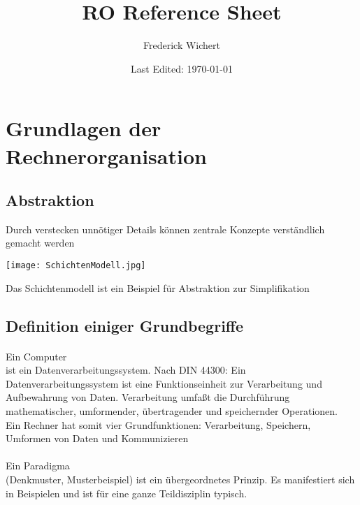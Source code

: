 


\begin{titlepage}
  \title{RO Reference Sheet} %
  \author{Frederick Wichert}
  \date{Last Edited: \today}
\end{titlepage}



	\maketitle
	
	\setcounter{secnumdepth}{2}
	\setcounter{tocdepth}{2}
	\tableofcontents
	
	\newpage
		
\section{Grundlagen der Rechnerorganisation}
	\subsection{Abstraktion}
		Durch verstecken unnötiger Details können zentrale Konzepte verständlich gemacht werden \\
		\begin{center}
			\texttt{[image: SchichtenModell.jpg]}
		\end{center}
		Das Schichtenmodell ist ein Beispiel für Abstraktion zur Simplifikation


	\subsection{Definition einiger Grundbegriffe}
		\paragraph{} Ein Computer \\ ist ein Datenverarbeitungssystem. Nach DIN 44300: Ein 
		Datenverarbeitungssystem ist eine Funktionseinheit zur Verarbeitung und Aufbewahrung 
		von Daten. Verarbeitung umfa\ss t die Durchführung mathematischer, umformender, übertragender und
		speichernder Operationen. \\
		Ein Rechner hat somit vier Grundfunktionen: Verarbeitung, Speichern, Umformen von Daten und Kommunizieren

		\paragraph{} Ein Paradigma \\ (Denkmuster, Musterbeispiel) ist ein übergeordnetes Prinzip.
		Es manifestiert sich in Beispielen und ist für eine ganze Teildisziplin typisch.

